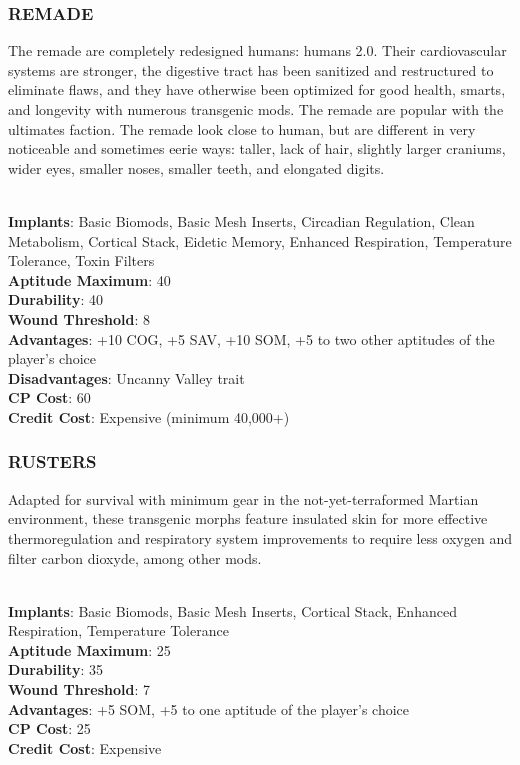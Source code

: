 \subsubsection{REMADE}
The remade are completely redesigned humans: humans 2.0. Their cardiovascular
systems are stronger, the digestive tract has been sanitized and restructured
to eliminate flaws, and they have otherwise been optimized for good health,
smarts, and longevity with numerous transgenic mods. The remade are popular
with the ultimates faction. The remade look close to human, but are different
in very noticeable and sometimes eerie ways: taller, lack of hair, slightly
larger craniums, wider eyes, smaller noses, smaller teeth, and elongated
digits.

\\ \textbf{Implants}: Basic Biomods, Basic Mesh Inserts, Circadian Regulation, Clean Metabolism, Cortical Stack, Eidetic Memory, Enhanced Respiration, Temperature Tolerance, Toxin Filters
\\ \textbf{Aptitude Maximum}: 40
\\ \textbf{Durability}: 40
\\ \textbf{Wound Threshold}: 8
\\ \textbf{Advantages}: +10 COG, +5 SAV, +10 SOM, +5 to two other aptitudes of the player’s choice
\\ \textbf{Disadvantages}: Uncanny Valley trait
\\ \textbf{CP Cost}: 60
\\ \textbf{Credit Cost}: Expensive (minimum 40,000+)

\subsubsection{RUSTERS}
Adapted for survival with minimum gear in the not-yet-terraformed Martian
environment, these transgenic morphs feature insulated skin for more effective
thermoregulation and respiratory system improvements to require less oxygen
and filter carbon dioxyde, among other mods.

\\ \textbf{Implants}: Basic Biomods, Basic Mesh Inserts, Cortical Stack, Enhanced Respiration, Temperature Tolerance
\\ \textbf{Aptitude Maximum}: 25
\\ \textbf{Durability}: 35
\\ \textbf{Wound Threshold}: 7
\\ \textbf{Advantages}: +5 SOM, +5 to one aptitude of the player’s choice
\\ \textbf{CP Cost}: 25
\\ \textbf{Credit Cost}: Expensive


